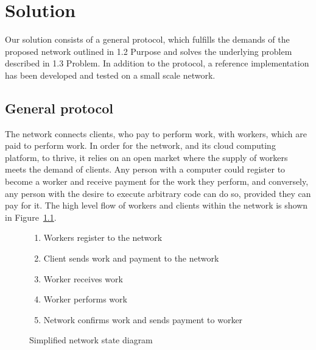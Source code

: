 \chapter{Solution}
Our solution consists of a general protocol, which fulfills the demands of the proposed network outlined in 1.2 Purpose and solves the underlying problem described in 1.3 Problem.
In addition to the protocol, a reference implementation has been developed and tested on a small scale network.

\section{General protocol}
The network connects clients, who pay to perform work, with workers, which are paid to perform work. In order for the network, and its cloud computing platform, to thrive, it relies on an open market where the supply of workers meets the demand of clients. Any person with a computer could register to become a worker and receive payment for the work they perform, and conversely, any person with the desire to execute arbitrary code can do so, provided they can pay for it. The high level flow of workers and clients within the network is shown in Figure~\ref{network-schema}.

\begin{figure}[ht]
\centering
{}

\begin{enumerate}
\item Workers register to the network
\item Client sends work and payment to the network
\item Worker receives work
\item Worker performs work
\item Network confirms work and sends payment to worker
\end{enumerate}
\caption{Simplified network state diagram}
\label{network-schema}
\end{figure}

